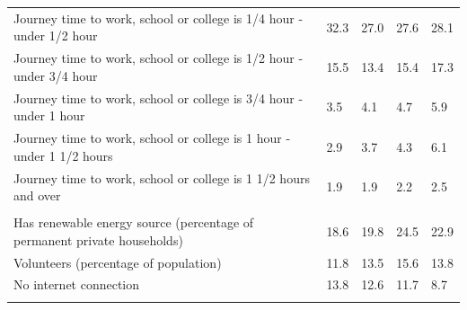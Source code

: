 \documentclass{article}
\begin{document}
\begin{table}[h]
\begin{tabular}{KTTTT}
Journey time to work, school or college is 1/4 hour - under 1/2 hour & 32.3& 27.0& 27.6& 28.1\\
Journey time to work, school or college is 1/2 hour - under 3/4 hour & 15.5& 13.4& 15.4& 17.3\\
Journey time to work, school or college is 3/4 hour - under 1 hour & 3.5& 4.1& 4.7& 5.9\\
Journey time to work, school or college is 1 hour - under 1 1/2 hours & 2.9& 3.7& 4.3& 6.1\\
Journey time to work, school or college is 1 1/2 hours and over & 1.9& 1.9& 2.2& 2.5\\
\hline
    \\ 
    \hline
Has renewable energy source (percentage of permanent private households) & 18.6& 19.8& 24.5& 22.9\\
    \hline
Volunteers (percentage of population) & 11.8& 13.5& 15.6& 13.8\\
    \hline
No internet connection& 13.8& 12.6& 11.7&  8.7\\
\hline
\end{tabular}
\end{table}
\end{document}
